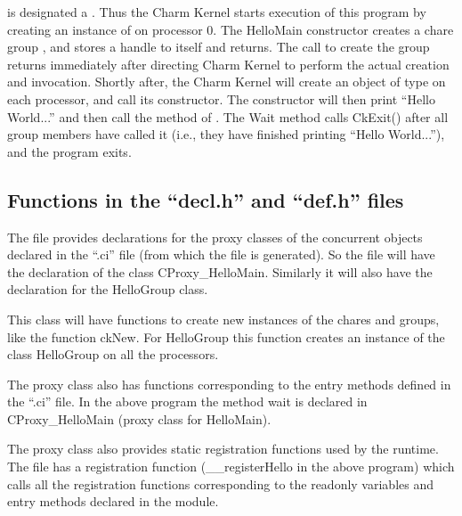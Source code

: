  is designated a . Thus the Charm Kernel starts 
execution of this program by creating an instance of  on 
processor 0. The HelloMain constructor creates a chare group ,
 and stores a handle to itself and returns. The call to create the 
group returns immediately after directing Charm Kernel to perform 
the actual creation and invocation. 
Shortly after, the Charm Kernel will create an object of type
 on each processor, and call its constructor. The constructor 
will then print 
``Hello World...'' and then call the  method 
of . The Wait method calls CkExit() after all group members have called it (i.e., they have finished printing ``Hello World...''), and the \charmpp program exits.

\subsection{Functions in the ``decl.h'' and ``def.h'' files}

	The  file provides declarations for the proxy classes of the concurrent objects declared in the ``.ci'' file (from which the  file is generated). So the  file will have the declaration of the class CProxy\_HelloMain. Similarly it will also have the declaration for the HelloGroup class. 

	This class will have functions to create new instances of the chares and groups, like the function ckNew. For HelloGroup this function creates an instance of the class HelloGroup on all the processors. 

	The proxy class also has functions corresponding to the entry methods defined in the ``.ci'' file. In the above program the method wait is declared in CProxy\_HelloMain (proxy class for HelloMain).

	The proxy class also provides static registration functions used by the \charmpp runtime.  The  file has a registration function (\_\_registerHello in the above program) which calls all the registration functions corresponding to the readonly variables and entry methods declared in the module.


	






